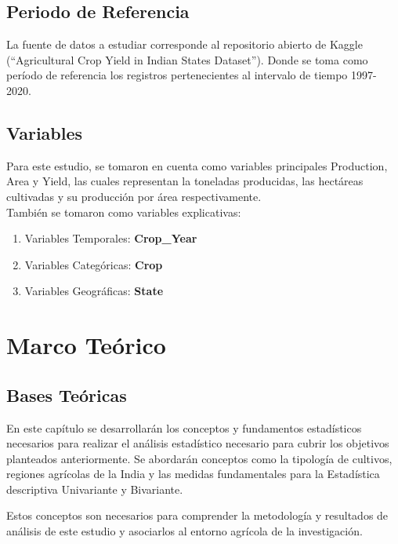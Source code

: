 \documentclass[oneside,11pt]{Latex/Classes/PhDthesisPSnPDF}
\begin{document}
\section{Periodo de Referencia}

La fuente de datos a estudiar corresponde al repositorio abierto de
Kaggle (``Agricultural Crop Yield in Indian States Dataset''). Donde se
toma como período de referencia los registros pertenecientes al
intervalo de tiempo 1997-2020.

\section{Variables}

Para este estudio, se tomaron en cuenta como variables principales
Production, Area y Yield, las cuales representan la toneladas
producidas, las hectáreas cultivadas y su producción por área
respectivamente.\\

También se tomaron como variables explicativas:

\begin{enumerate}
  \item Variables Temporales: \textbf{Crop\_Year}
  \item Variables Categóricas: \textbf{Crop}
  \item Variables Geográficas: \textbf{State}
\end{enumerate}

\chapter{Marco Teórico}

\section{Bases Teóricas}

En este capítulo se desarrollarán los conceptos y fundamentos
estadísticos necesarios para realizar el análisis estadístico necesario
para cubrir los objetivos planteados anteriormente. Se abordarán
conceptos como la tipología de cultivos, regiones agrícolas de la India
y las medidas fundamentales para la Estadística descriptiva Univariante
y Bivariante.

Estos conceptos son necesarios para comprender la metodología y
resultados de análisis de este estudio y asociarlos al entorno agrícola
de la investigación.\\
\end{document}
